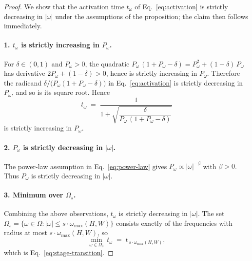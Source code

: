 \begin{proof}
\leavevmode

We show that the activation time $t_\omega$ of Eq.~\eqref{eq:activation} is strictly decreasing in $|\omega|$ under the assumptions of the proposition; the claim then follows immediately.

\paragraph{1. $t_\omega$ is strictly increasing in $P_\omega$.}
For $\delta \in (0, 1)$ and $P_\omega > 0$, the quadratic $P_\omega\,(1 + P_\omega - \delta) = P_\omega^2 + (1-\delta)\, P_\omega$ has derivative $2 P_\omega + (1-\delta) > 0$, hence is strictly increasing in $P_\omega$. Therefore the radicand $\delta / \bigl(P_\omega(1 + P_\omega - \delta)\bigr)$ in Eq.~\eqref{eq:activation} is strictly decreasing in $P_\omega$, and so is its square root. Hence
\begin{equation}
  t_\omega \;=\; \frac{1}{1 + \sqrt{\dfrac{\delta}{P_\omega\,(1 + P_\omega - \delta)}}}
\end{equation}
is strictly increasing in $P_\omega$.

\paragraph{2. $P_\omega$ is strictly decreasing in $|\omega|$.}
The power-law assumption in Eq.~\eqref{eq:power-law} gives $P_\omega \propto |\omega|^{-\beta}$ with $\beta > 0$. Thus $P_\omega$ is strictly decreasing in $|\omega|$.

\paragraph{3. Minimum over $\Omega_s$.}
Combining the above observations, $t_\omega$ is strictly decreasing in $|\omega|$. The set $\Omega_s = \{\omega \in \Omega : |\omega| \le s \cdot \omega_{\max}(H, W)\}$ consists exactly of the frequencies with radius at most $s \cdot \omega_{\max}(H, W)$, so
\begin{equation}
  \min_{\omega \in \Omega_s}\, t_\omega \;=\; t_{\,s \cdot \omega_{\max}(H, W)},
\end{equation}
which is Eq.~\eqref{eq:stage-transition}.
\end{proof}

\clearpage


\clearpage


